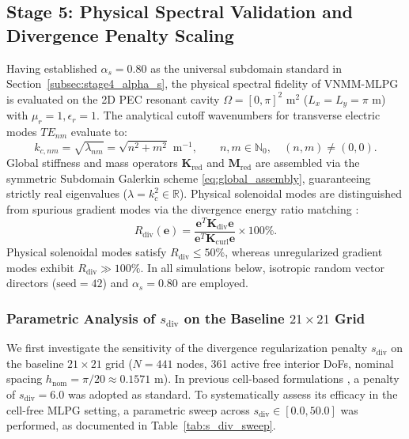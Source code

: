 \documentclass[preprint,12pt]{elsarticle}
\begin{document}
\subsection{Stage 5: Physical Spectral Validation and Divergence Penalty Scaling}
\label{subsec:stage5_cavity}

Having established $\alpha_s = 0.80$ as the universal subdomain standard in Section~\ref{subsec:stage4_alpha_s}, the physical spectral fidelity of VNMM-MLPG is evaluated on the 2D PEC resonant cavity $\Omega = [0, \pi]^2\text{ m}^2$ ($L_x = L_y = \pi\text{ m}$) with $\mu_r = 1, \epsilon_r = 1$. The analytical cutoff wavenumbers for transverse electric modes $TE_{nm}$ evaluate to:
\begin{equation}
    k_{c, nm} = \sqrt{\lambda_{nm}} = \sqrt{n^2 + m^2}\text{ m}^{-1}, \qquad n, m \in \mathbb{N}_0, \quad (n, m) \ne (0, 0).
    \label{eq:analytical_cavity_kc}
\end{equation}
Global stiffness and mass operators $\mathbf{K}_{\mathrm{red}}$ and $\mathbf{M}_{\mathrm{red}}$ are assembled via the symmetric Subdomain Galerkin scheme \eqref{eq:global_assembly}, guaranteeing strictly real eigenvalues ($\lambda = k_c^2 \in \mathbb{R}$). Physical solenoidal modes are distinguished from spurious gradient modes via the divergence energy ratio matching \cite{stable_vnmm2d_2026}:
\begin{equation}
    R_{\mathrm{div}}(\mathbf{e}) = \frac{\mathbf{e}^T \mathbf{K}_{\mathrm{div}} \mathbf{e}}{\mathbf{e}^T \mathbf{K}_{\mathrm{curl}} \mathbf{e}} \times 100\%.
    \label{eq:R_div_definition}
\end{equation}
Physical solenoidal modes satisfy $R_{\mathrm{div}} \le 50\%$, whereas unregularized gradient modes exhibit $R_{\mathrm{div}} \gg 100\%$. In all simulations below, isotropic random vector directors ($\text{seed}=42$) and $\alpha_s = 0.80$ are employed.

\subsubsection{Parametric Analysis of $s_{\mathrm{div}}$ on the Baseline $21\times 21$ Grid}
\label{subsubsec:s_div_sweep}

We first investigate the sensitivity of the divergence regularization penalty $s_{\mathrm{div}}$ on the baseline $21 \times 21$ grid ($N = 441$ nodes, 361 active free interior DoFs, nominal spacing $h_{\mathrm{nom}} = \pi/20 \approx 0.1571\text{ m}$). In previous cell-based formulations \cite{stable_vnmm2d_2026}, a penalty of $s_{\mathrm{div}} = 6.0$ was adopted as standard. To systematically assess its efficacy in the cell-free MLPG setting, a parametric sweep across $s_{\mathrm{div}} \in [0.0, 50.0]$ was performed, as documented in Table~\ref{tab:s_div_sweep}.
\end{document}
